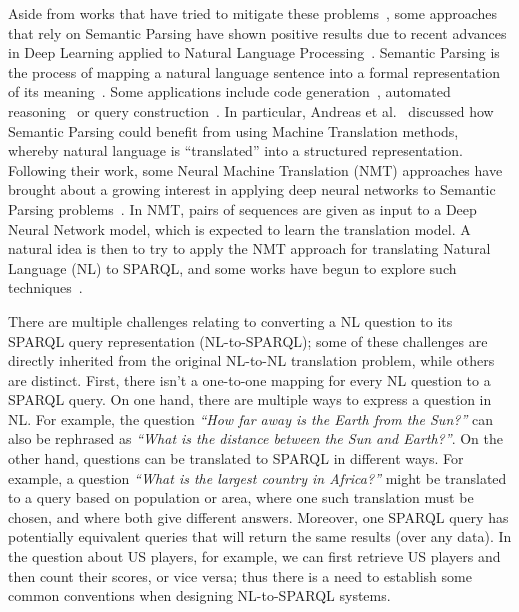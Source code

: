 Aside from works that have tried to mitigate these problems~\cite{semPar:lexical-gap-HakimovUWC15, semPar:complex-queries-GliozzoK12}, some approaches 
that rely on Semantic Parsing have shown positive results due to recent advances in Deep 
Learning applied to Natural Language Processing~\cite{semPar:sempar-as-mt-AndreasVC13}. Semantic Parsing is the process of 
mapping a natural language sentence into a formal representation of its meaning~\cite{semPar:sempar-as-mt-AndreasVC13}. Some 
applications include code generation~\cite{semPar:code-gen-RabinovichSK17, semPar:tranx-code-gen-YinN18}, 
automated reasoning~\cite{semPar:ITPKaliszykUV17} or query construction~\cite{semPar:txt-to-sql-RadevKZZFRS18}. 
In particular, Andreas et al.~\cite{semPar:sempar-as-mt-AndreasVC13} discussed how Semantic Parsing could benefit from using 
Machine Translation methods, whereby natural language is “translated” into a structured 
representation. Following their work, some Neural Machine Translation (NMT) approaches 
have brought about a growing interest in applying deep neural networks to Semantic Parsing 
problems~\cite{nmt:CaiXZYLL18, nmt:DongL16, nmt:ZhongCoRR17}. In NMT, pairs of sequences are given as input to a Deep Neural Network 
model, which is expected to learn the translation model. A natural idea is then to try to apply 
the NMT approach for translating Natural Language (NL) to SPARQL, and some works have begun to explore such techniques~\cite{nmt:CoRRLuz18, nmt:nspm-SoruMMPVEN17, nmt:CoRRSoru18}.

There are multiple challenges relating to converting a NL question to its SPARQL query 
representation (NL-to-SPARQL); some of these challenges are directly inherited from the 
original NL-to-NL translation problem, while others are distinct. First, there isn’t a one-to-one 
mapping for every NL question to a SPARQL query. On one hand, there are multiple ways to 
express a question in NL. For example, the question \textit{“How far away is the Earth from the Sun?”} 
can also be rephrased as \textit{“What is the distance between the Sun and Earth?”}. On the other 
hand, questions can be translated to SPARQL in different ways. For example, a question \textit{“What 
is the largest country in Africa?”} might be translated to a query based on population or area, 
where one such translation must be chosen, and where both give different answers. Moreover, 
one SPARQL query has potentially equivalent queries that will return the same results (over any 
data). In the question about US players, for example, we can first retrieve US players and then 
count their scores, or vice versa; thus there is a need to establish some common conventions 
when designing NL-to-SPARQL systems. 

